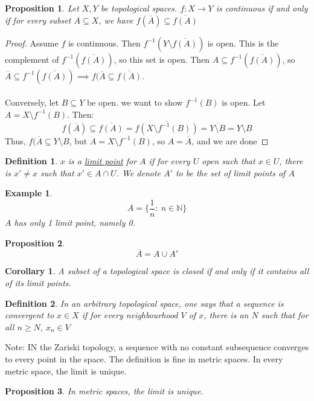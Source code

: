 \documentclass{article}
\newcommand{\N}{\mathbb{N}}
\newtheorem{example}{Example}
\newtheorem{proposition}{Proposition}
\newtheorem{corollary}{Corollary}
\newtheorem{definition}{Definition}
\begin{document}
 \begin{proposition}
 Let $X,Y$ be topological spaces. $f:X\rightarrow Y$ is continuous if and only if for every subset $A\subseteq X$, we have $f(\overline{A})\subseteq \overline{f(A)}$
 \end{proposition}
 \begin{proof}
 Assume $f$ is continuous. Then $f^{-1}(Y\setminus \overline{f(A)})$ is open. This is the complement of $f^{-1}(\overline{f(A)})$, so this set is open. Then $A\subseteq f^{-1}(\overline{f(A)})$, so $\overline{A}\subseteq f^{-1}(\overline{f(A)})\implies f(\overline{A}\subseteq \overline{f(A)}$.\\
 \\
 Conversely, let $B\subseteq Y$ be open. we want to show $f^{-1}(B)$ is open. Let $A=X\setminus f^{-1}(B).$ Then:
 $$f(\overline{A})\subseteq \overline{f(A)}=\overline{f(X\setminus f^{-1}(B))}=\overline{Y\setminus B} = Y\setminus B$$
 Thus, $f(\overline{A}\subseteq Y\setminus B$, but $A=X\setminus f^{-1}(B)$, so $A=\overline{A}$, and we are done
 \end{proof}
 \begin{definition}
 $x$ is a \underline{limit point} for $A$ if for every $U$ open such that $x\in U$, there is $x'\neq x$ such that $x'\in A\cap U$. We denote $A'$ to be the set of limit points of $A$
 \end{definition}
 \begin{example}
 $$A=\{\frac{1}{n}:\ n\in\N\}$$
 $A$ has only 1 limit point, namely 0. 
 \end{example}
 \begin{proposition}
 $$\overline{A}=A\cup A'$$
 \end{proposition}
 \begin{corollary}
 A subset of a topological space is closed if and only if it contains all of its limit points.
 \end{corollary}
 \begin{definition}
 In an arbitrary topological space, one says that a sequence is convergent to $x\in X$ if for every neighbourhood $V$ of $x$, there is an $N$ such that for all $n\geq N$, $x_n\in V$
 \end{definition}
 \noindent Note: IN the Zariski topology, a sequence with no constant subsequence converges to every point in the space. The definition is fine in metric spaces. In every metric space, the limit is unique.
 \begin{proposition}
 In metric spaces, the limit is unique. 
 \end{proposition}
\end{document}
